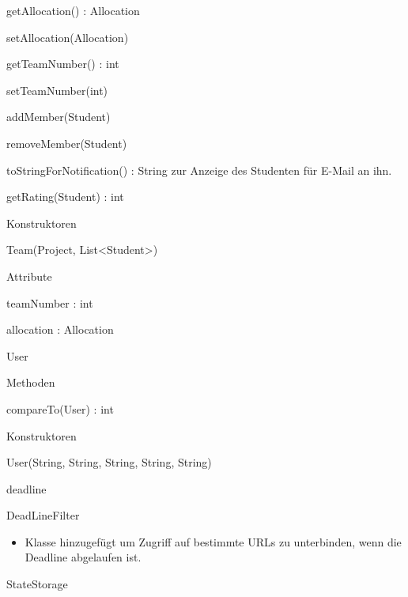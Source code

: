 \documentclass[parskip=full]{scrartcl}
\newcommand{\changeDescription}[1]{{\newline\color{black}\normalfont #1}}
\newcommand{\code}[1]{{\ttfamily #1}}
\begin{document}
\begin{itemPackage}
\begin{itemClass}
\begin{itemClassSub}
\begin{itemPlus}
\item getAllocation() : Allocation
\item setAllocation(Allocation)
\item getTeamNumber() : int
\item setTeamNumber(int)
\item addMember(Student)
\item removeMember(Student)
\item toStringForNotification() : String \changeDescription{\code{toString()}
zur Anzeige des Studenten für E-Mail an ihn.}
\end{itemPlus}
\begin{itemMinus}
\item getRating(Student) : int
\end{itemMinus}
\item Konstruktoren
\begin{itemPlus}
\item Team(Project, List<Student>)
\end{itemPlus}
\item Attribute 
\begin{itemPlus}
\item teamNumber : int
\item allocation : Allocation
\end{itemPlus}
\end{itemClassSub}
\item User
\begin{itemClassSub}
\item Methoden
\begin{itemPlus}
\item compareTo(User) : int
\end{itemPlus}
\item Konstruktoren
\begin{itemPlus}
\item User(String, String, String, String, String)
\end{itemPlus}
\end{itemClassSub}
\end{itemClass}
\item deadline
	\begin{itemClass}
	\item DeadLineFilter
	\begin{itemize}
	  \item Klasse hinzugefügt um Zugriff auf bestimmte URLs zu unterbinden, wenn
	  die Deadline abgelaufen ist.
	\end{itemize}
	\item StateStorage 

\end{itemClass}
\end{itemPackage}
\end{document}
